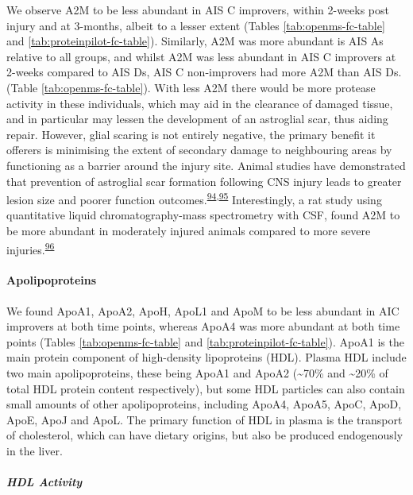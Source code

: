 \documentclass[
]{article}
\begin{document}
We observe A2M to be less abundant in AIS C improvers, within 2-weeks post injury and at 3-months, albeit to a lesser extent (Tables \ref{tab:openms-fc-table} and \ref{tab:proteinpilot-fc-table}).
Similarly, A2M was more abundant is AIS As relative to all groups, and whilst A2M was less abundant in AIS C improvers at 2-weeks compared to AIS Ds, AIS C non-improvers had more A2M than AIS Ds. (Table \ref{tab:openms-fc-table}).
With less A2M there would be more protease activity in these individuals, which may aid in the clearance of damaged tissue, and in particular may lessen the development of an astroglial scar, thus aiding repair.
However, glial scaring is not entirely negative, the primary benefit it offerers is minimising the extent of secondary damage to neighbouring areas by functioning as a barrier around the injury site.
Animal studies have demonstrated that prevention of astroglial scar formation following CNS injury leads to greater lesion size and poorer function outcomes.\textsuperscript{\protect\hyperlink{ref-anderson_astrocyte_2016}{94},\protect\hyperlink{ref-wilhelmsson_redefining_2006}{95}}
Interestingly, a rat study using quantitative liquid chromatography-mass spectrometry with CSF, found A2M to be more abundant in moderately injured animals compared to more severe injuries.\textsuperscript{\protect\hyperlink{ref-lubieniecka_biomarkers_2011}{96}}

\hypertarget{apolipoproteins}{%
\paragraph{Apolipoproteins}\label{apolipoproteins}}

We found ApoA1, ApoA2, ApoH, ApoL1 and ApoM to be less abundant in AIC improvers at both time points, whereas ApoA4 was more abundant at both time points (Tables \ref{tab:openms-fc-table} and \ref{tab:proteinpilot-fc-table}).
ApoA1 is the main protein component of high-density lipoproteins (HDL).
Plasma HDL include two main apolipoproteins, these being ApoA1 and ApoA2 (\textasciitilde70\% and \textasciitilde20\% of total HDL protein content respectively), but some HDL particles can also contain small amounts of other apolipoproteins, including ApoA4, ApoA5, ApoC, ApoD, ApoE, ApoJ and ApoL.
The primary function of HDL in plasma is the transport of cholesterol, which can have dietary origins, but also be produced endogenously in the liver.

\hypertarget{hdl-activity}{%
\subparagraph{HDL Activity}\label{hdl-activity}}
\end{document}
